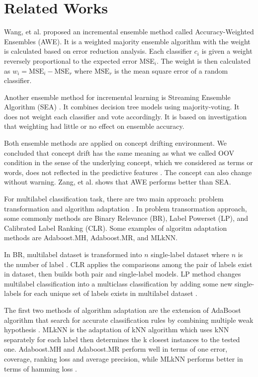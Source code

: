 \documentclass[conference]{IEEEtran}
\begin{document}
\section{Related Works}

Wang, et al. \cite{wang} proposed an incremental ensemble method called Accuracy-Weighted Ensembles (AWE).
It is a weighted majority ensemble algorithm with the weight is calculated based on error reduction analysis.
Each classifier $c_i$ is given a weight reversely proportional to the expected error MSE$_i$.
The weight is then calculated as $w_i = \text{MSE}_i - \text{MSE}_r$ where $\text{MSE}_r$ is the mean square error of a random classifier.

Another ensemble method for incremental learning is Streaming Ensemble Algorithm (SEA) \cite{street}.
It combines decision tree models using majority-voting.
It does not weight each classifier and vote accordingly.
It is based on investigation that weighting had little or no effect on ensemble accuracy.

Both ensemble methods are applied on concept drifting environment.
We concluded that concept drift has the same meaning as what we called OOV condition in the sense of the underlying concept, which we considered as terms or words, does not reflected in the predictive features \cite{street}.
The concept can also change without warning.
Zang, et al. \cite{zang} shows that AWE performs better than SEA.

For multilabel classification task, there are two main approach: problem transformation and algorithm adaptation \cite{tsoumakas}.
In problem transormation approach, some commonly methods are Binary Relevance (BR), Label Powerset (LP), and Calibrated Label Ranking (CLR).
Some examples of algoritm adaptation methods are Adaboost.MH, Adaboost.MR, and MLkNN.

In BR, multilabel dataset is transformed into $n$ single-label dataset where $n$ is the number of label \cite{prajapati}.
CLR applies the comparisons among the pair of labels exist in dataset, then builds both pair and single-label models.
LP method changes multilabel classification into a multiclass classification \cite{demb} by adding some new single-labels for each unique set of labels exists in multilabel dataset \cite{prajapati}.

The first two methods of algorithm adaptation are the extension of AdaBoost algorithm that search for accurate classification rules by combining multiple weak hypothesis \cite{dharmadhikari}.
MLkNN is the adaptation of kNN algorithm which uses kNN separately for each label then determines the k closest instances to the tested one.
Adaboost.MH and Adaboost.MR perform well in terms of one error, coverage, ranking loss and average precision, while MLkNN performs better in terms of hamming loss \cite{zhang}.
\end{document}
